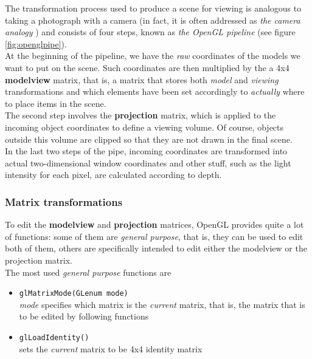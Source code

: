 The transformation process used to produce a scene for viewing 
is analogous to taking a photograph with a camera (in fact, it 
is often addressed as \textit{the camera analogy} 
\cite{opengl:cameraanalogy}) 
and consists of four steps, known as
\textit{the OpenGL pipeline} (see figure \ref{fig:openglpipe}).
\\
At the beginning of the pipeline, we have the \textit{raw} 
coordinates of the models we want to put on the scene. Such 
coordinates are then multiplied by the a 4x4 \textbf{modelview} 
matrix, that is, a matrix that stores both \textit{model} and 
\textit{viewing} transformations and which elements have been set 
accordingly to \textit{actually} where to place items in the scene.
\\
The second step involves the \textbf{projection} matrix, 
which is applied to the incoming object coordinates to define a 
viewing volume. Of course, objects outside this volume are clipped 
so that they are not drawn in the final scene. 
\\
In the last two steps of the pipe, incoming coordinates are transformed 
into actual two-dimensional window coordinates and other stuff, such as 
the light intensity for each pixel, are calculated according to depth.

\subsubsection{Matrix transformations}
\label{sec:opengl:opengl_note:matrix_transfor}

To edit the \textbf{modelview} and \textbf{projection} matrices, OpenGL 
provides quite a lot of functions: some of them are 
\textit{general purpose}, that is, they can be used to edit both of them, 
others are specifically intended to edit either the modelview or the 
projection matrix.
\\
The most used \textit{general purpose} functions are 

\begin{itemize}
\item \texttt{glMatrixMode(GLenum mode)} \\
  \textit{mode} specifies which matrix is the \textit{current}
  matrix, that is, the matrix that is to be edited by following
  functions
  
\item \texttt{glLoadIdentity()} \\
  sets the \textit{current} matrix to be 4x4 identity matrix
\end{itemize}

